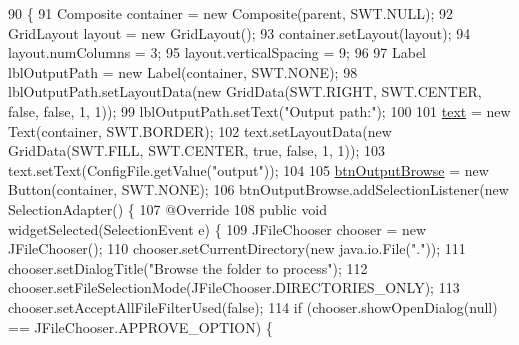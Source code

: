 \begin{DoxyCode}
90                                                 \{
91         Composite container = \textcolor{keyword}{new} Composite(parent, SWT.NULL);
92         GridLayout layout = \textcolor{keyword}{new} GridLayout();
93         container.setLayout(layout);
94         layout.numColumns = 3;
95         layout.verticalSpacing = 9;
96         
97         Label lblOutputPath = \textcolor{keyword}{new} Label(container, SWT.NONE);
98         lblOutputPath.setLayoutData(\textcolor{keyword}{new} GridData(SWT.RIGHT, SWT.CENTER, \textcolor{keyword}{false}, \textcolor{keyword}{false}, 1, 1));
99         lblOutputPath.setText(\textcolor{stringliteral}{"Output path:"});
100         
101         \hyperlink{classit_1_1isislab_1_1masonassisteddocumentation_1_1mason_1_1wizards_1_1_b___project_information_page_aae0eab045b1d0530a794116410ae6e5d}{text} = \textcolor{keyword}{new} Text(container, SWT.BORDER);
102         text.setLayoutData(\textcolor{keyword}{new} GridData(SWT.FILL, SWT.CENTER, \textcolor{keyword}{true}, \textcolor{keyword}{false}, 1, 1));
103         text.setText(ConfigFile.getValue(\textcolor{stringliteral}{"output"}));
104         
105         \hyperlink{classit_1_1isislab_1_1masonassisteddocumentation_1_1mason_1_1wizards_1_1_b___project_information_page_a0cbfd9890c8c62af7cfce149089682b5}{btnOutputBrowse} = \textcolor{keyword}{new} Button(container, SWT.NONE);
106         btnOutputBrowse.addSelectionListener(\textcolor{keyword}{new} SelectionAdapter() \{
107             @Override
108             \textcolor{keyword}{public} \textcolor{keywordtype}{void} widgetSelected(SelectionEvent e) \{
109                 JFileChooser chooser = \textcolor{keyword}{new} JFileChooser();
110                 chooser.setCurrentDirectory(\textcolor{keyword}{new} java.io.File(\textcolor{stringliteral}{"."}));
111                 chooser.setDialogTitle(\textcolor{stringliteral}{"Browse the folder to process"});
112                 chooser.setFileSelectionMode(JFileChooser.DIRECTORIES\_ONLY);
113                 chooser.setAcceptAllFileFilterUsed(\textcolor{keyword}{false});
114                 \textcolor{keywordflow}{if} (chooser.showOpenDialog(null) == JFileChooser.APPROVE\_OPTION) \{                         
           

\end{DoxyCode}

